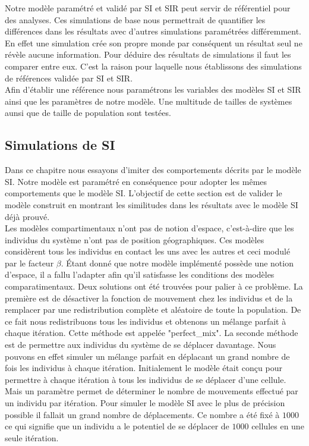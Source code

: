 Notre modèle paramétré et validé par SI et SIR peut servir de référentiel pour des analyses. Ces simulations de base nous permettrait de quantifier les différences dans les résultats avec d'autres simulations paramétrées différemment. En effet une simulation crée son propre monde par conséquent un résultat seul ne révèle aucune information. Pour déduire des résultats de simulations il faut les comparer entre eux. C'est la raison pour laquelle nous établissons des simulations de références validée par SI et SIR.\\

Afin d'établir une référence nous paramétrons les variables des modèles SI et SIR ainsi que les paramètres de notre modèle. Une multitude de tailles de systèmes aunsi que de taille de population sont testées.\\

\subsection{Simulations de SI}

Dans ce chapitre nous essayons d'imiter des comportements décrits par le modèle SI. Notre modèle est paramétré en conséquence pour adopter les mêmes comportements que le modèle SI. L'objectif de cette section est de valider le modèle construit en montrant les similitudes dans les résultats avec le modèle SI déjà prouvé. \\

Les modèles compartimentaux n'ont pas de notion d'espace, c'est-à-dire que les individus du système n'ont pas de position géographiques. Ces modèles considèrent tous les individus en contact les uns avec les autres et ceci modulé par le facteur $\beta$. Étant donné que notre modèle implémenté possède une notion d'espace, il a fallu l'adapter afin qu'il satisfasse les conditions des modèles comparatimentaux. Deux solutions ont été trouvées pour palier à ce problème. La première est de désactiver la fonction de mouvement chez les individus et de la remplacer par une redistribution complète et aléatoire de toute la population. De ce fait nous redistribuons tous les individus et obtenons un mélange parfait à chaque itération. Cette méthode est appelée "perfect\_mix". La seconde méthode est de permettre aux individus du système de se déplacer davantage. Nous pouvons en effet simuler un mélange parfait en déplacant un grand nombre de fois les individus à chaque itération. Initialement le modèle était conçu pour permettre à chaque itération à tous les individus de se déplacer d'une cellule. Mais un paramètre permet de déterminer le nombre de mouvements effectué par un individu par itération. Pour simuler le modèle SI avec le plus de précision possible il fallait un grand nombre de déplacements. Ce nombre a été fixé à $1000$ ce qui signifie que un individu a le potentiel de se déplacer de $1000$ cellules en une seule itération.\\

